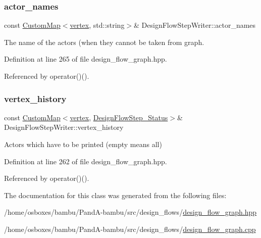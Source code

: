 \subsubsection{\texorpdfstring{actor\+\_\+names}{actor\_names}}
{\footnotesize\ttfamily const \hyperlink{custom__map_8hpp_a18ca01763abbe3e5623223bfe5aaac6b}{Custom\+Map}$<$\hyperlink{graph_8hpp_abefdcf0544e601805af44eca032cca14}{vertex}, std\+::string$>$\& Design\+Flow\+Step\+Writer\+::actor\+\_\+names\hspace{0.3cm}{\ttfamily [private]}}



The name of the actors (when they cannot be taken from graph. 



Definition at line 265 of file design\+\_\+flow\+\_\+graph.\+hpp.



Referenced by operator()().

\mbox{\label{classDesignFlowStepWriter_af972e0108493754493763d0451405483}} 
\subsubsection{\texorpdfstring{vertex\+\_\+history}{vertex\_history}}
{\footnotesize\ttfamily const \hyperlink{custom__map_8hpp_a18ca01763abbe3e5623223bfe5aaac6b}{Custom\+Map}$<$\hyperlink{graph_8hpp_abefdcf0544e601805af44eca032cca14}{vertex}, \hyperlink{design__flow__step_8hpp_afb1f0d73069c26076b8d31dbc8ebecdf}{Design\+Flow\+Step\+\_\+\+Status}$>$\& Design\+Flow\+Step\+Writer\+::vertex\+\_\+history\hspace{0.3cm}{\ttfamily [private]}}



Actors which have to be printed (empty means all) 



Definition at line 262 of file design\+\_\+flow\+\_\+graph.\+hpp.



Referenced by operator()().



The documentation for this class was generated from the following files\+:\begin{DoxyCompactItemize}
\item 
/home/osboxes/bambu/\+Pand\+A-\/bambu/src/design\+\_\+flows/\hyperlink{design__flow__graph_8hpp}{design\+\_\+flow\+\_\+graph.\+hpp}\item 
/home/osboxes/bambu/\+Pand\+A-\/bambu/src/design\+\_\+flows/\hyperlink{design__flow__graph_8cpp}{design\+\_\+flow\+\_\+graph.\+cpp}\end{DoxyCompactItemize}
